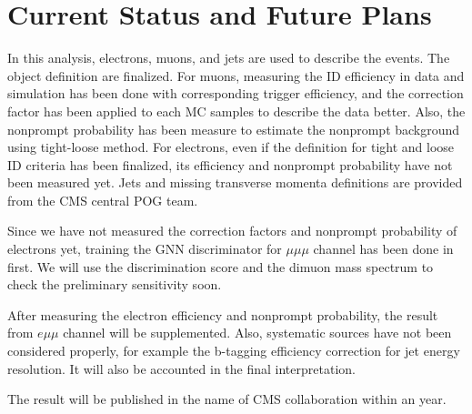 \documentclass[
12pt, %
a4paper, %
oneside, %
headinclude,footinclude, %
BCOR5mm, %
]{scrartcl}
\begin{document}
\section{Current Status and Future Plans}
In this analysis, electrons, muons, and jets are used to describe the events.
The object definition are finalized. For muons, measuring the ID efficiency in
data and simulation has been done with corresponding trigger efficiency, and
the correction factor has been applied to each MC samples to describe the data better.
Also, the nonprompt probability has been measure to estimate the nonprompt background
using tight-loose method. For electrons, even if the definition for tight and loose ID
criteria has been finalized, its efficiency and nonprompt probability have not been measured yet.
Jets and missing transverse momenta definitions are provided from the CMS central POG team.

Since we have not measured the correction factors and nonprompt probability of electrons yet,
training the GNN discriminator for $\mu\mu\mu$ channel has been done in first. We will use the
discrimination score and the dimuon mass spectrum to check the preliminary sensitivity soon.

After measuring the electron efficiency and nonprompt probability, the result from $e\mu\mu$
channel will be supplemented. Also, systematic sources have not been considered properly,
for example the b-tagging efficiency correction for jet energy resolution. It will also be
accounted in the final interpretation.

The result will be published in the name of CMS collaboration within an year.


\renewcommand{\refname}{\spacedlowsmallcaps{References}} %




\end{document}
